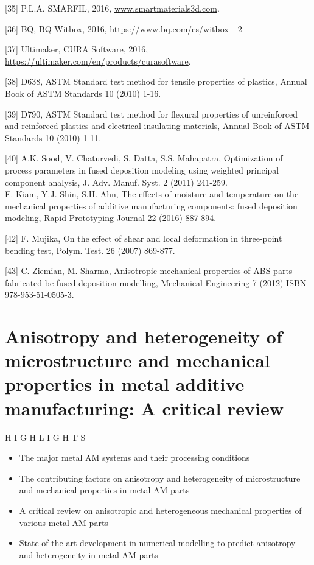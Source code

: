 \documentclass[10pt]{article}
\begin{document}
[35] P.L.A. SMARFIL, 2016, \href{http://www.smartmaterials3d.com}{www.smartmaterials3d.com}.

[36] BQ, BQ Witbox, 2016, \href{https://www.bq.com/es/witbox-_2}{https://www.bq.com/es/witbox-\_2}

[37] Ultimaker, CURA Software, 2016, \href{https://ultimaker.com/en/products/curasoftware}{https://ultimaker.com/en/products/curasoftware}.

[38] D638, ASTM Standard test method for tensile properties of plastics, Annual Book of ASTM Standards 10 (2010) 1-16.

[39] D790, ASTM Standard test method for flexural properties of unreinforced and reinforced plastics and electrical insulating materials, Annual Book of ASTM Standards 10 (2010) 1-11.

[40] A.K. Sood, V. Chaturvedi, S. Datta, S.S. Mahapatra, Optimization of process parameters in fused deposition modeling using weighted principal component analysis, J. Adv. Manuf. Syst. 2 (2011) 241-259.\\
[41] E. Kiam, Y.J. Shin, S.H. Ahn, The effects of moisture and temperature on the mechanical properties of additive manufacturing components: fused deposition modeling, Rapid Prototyping Journal 22 (2016) 887-894.

[42] F. Mujika, On the effect of shear and local deformation in three-point bending test, Polym. Test. 26 (2007) 869-877.

[43] C. Ziemian, M. Sharma, Anisotropic mechanical properties of ABS parts fabricated be fused deposition modelling, Mechanical Engineering 7 (2012) ISBN 978-953-51-0505-3.

\section*{Anisotropy and heterogeneity of microstructure and mechanical properties in metal additive manufacturing: A critical review }
H I G H L I G H T S

\begin{itemize}
  \item The major metal AM systems and their processing conditions

  \item The contributing factors on anisotropy and heterogeneity of microstructure and mechanical properties in metal AM parts

  \item A critical review on anisotropic and heterogeneous mechanical properties of various metal AM parts

  \item State-of-the-art development in numerical modelling to predict anisotropy and heterogeneity in metal AM parts

\end{itemize}
\end{document}
